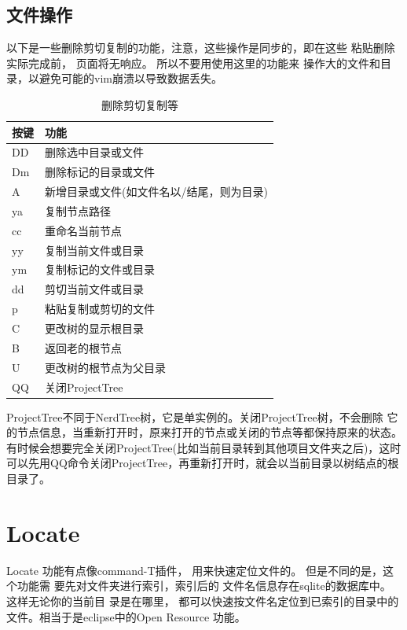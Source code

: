 \documentclass[oneside,openany]{book}
\begin{document}
  \subsection{文件操作}
  以下是一些删除剪切复制的功能，注意，这些操作是同步的，即在这些
粘贴删除实际完成前， 页面将无响应。 所以不要用使用这里的功能来
操作大的文件和目录，以避免可能的vim崩溃以导致数据丢失。
  \begin{table}[H]
  \caption{删除剪切复制等}
  \centering
      \begin{tabular}{p{40pt}p{220pt}}
        \toprule
        按键& 功能\\
        \midrule
          DD    &删除选中目录或文件\\
          Dm    &删除标记的目录或文件\\
          A     &新增目录或文件(如文件名以/结尾，则为目录)\\
          ya    &复制节点路径\\
          cc    &重命名当前节点\\
          yy    &复制当前文件或目录\\
          ym    &复制标记的文件或目录\\
          dd    &剪切当前文件或目录\\
          p     &粘贴复制或剪切的文件\\
          C     &更改树的显示根目录\\
          B     &返回老的根节点\\
          U     &更改树的根节点为父目录\\
          QQ    &关闭ProjectTree\\
        \bottomrule
      \end{tabular}
  \end{table}
  ProjectTree不同于NerdTree树，它是单实例的。关闭ProjectTree树，不会删除
它的节点信息，当重新打开时，原来打开的节点或关闭的节点等都保持原来的状态。
有时候会想要完全关闭ProjectTree(比如当前目录转到其他项目文件夹之后)，这时
可以先用QQ命令关闭ProjectTree，再重新打开时，就会以当前目录以树结点的根目录了。


\section{Locate}

    Locate 功能有点像command-T插件， 用来快速定位文件的。 但是不同的是，这个功能需
要先对文件夹进行索引，索引后的 文件名信息存在sqlite的数据库中。 这样无论你的当前目
录是在哪里， 都可以快速按文件名定位到已索引的目录中的文件。相当于是eclipse中的Open Resource
功能。
\end{document}
